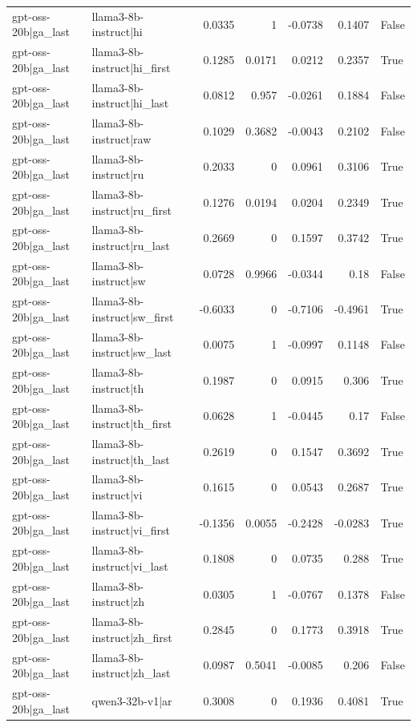 \begin{table}
\begin{tabular}{l l r r r r l}
gpt-oss-20b|ga_last & llama3-8b-instruct|hi & 0.0335 & 1 & -0.0738 & 0.1407 & False \\
gpt-oss-20b|ga_last & llama3-8b-instruct|hi_first & 0.1285 & 0.0171 & 0.0212 & 0.2357 & True \\
gpt-oss-20b|ga_last & llama3-8b-instruct|hi_last & 0.0812 & 0.957 & -0.0261 & 0.1884 & False \\
gpt-oss-20b|ga_last & llama3-8b-instruct|raw & 0.1029 & 0.3682 & -0.0043 & 0.2102 & False \\
gpt-oss-20b|ga_last & llama3-8b-instruct|ru & 0.2033 & 0 & 0.0961 & 0.3106 & True \\
gpt-oss-20b|ga_last & llama3-8b-instruct|ru_first & 0.1276 & 0.0194 & 0.0204 & 0.2349 & True \\
gpt-oss-20b|ga_last & llama3-8b-instruct|ru_last & 0.2669 & 0 & 0.1597 & 0.3742 & True \\
gpt-oss-20b|ga_last & llama3-8b-instruct|sw & 0.0728 & 0.9966 & -0.0344 & 0.18 & False \\
gpt-oss-20b|ga_last & llama3-8b-instruct|sw_first & -0.6033 & 0 & -0.7106 & -0.4961 & True \\
gpt-oss-20b|ga_last & llama3-8b-instruct|sw_last & 0.0075 & 1 & -0.0997 & 0.1148 & False \\
gpt-oss-20b|ga_last & llama3-8b-instruct|th & 0.1987 & 0 & 0.0915 & 0.306 & True \\
gpt-oss-20b|ga_last & llama3-8b-instruct|th_first & 0.0628 & 1 & -0.0445 & 0.17 & False \\
gpt-oss-20b|ga_last & llama3-8b-instruct|th_last & 0.2619 & 0 & 0.1547 & 0.3692 & True \\
gpt-oss-20b|ga_last & llama3-8b-instruct|vi & 0.1615 & 0 & 0.0543 & 0.2687 & True \\
gpt-oss-20b|ga_last & llama3-8b-instruct|vi_first & -0.1356 & 0.0055 & -0.2428 & -0.0283 & True \\
gpt-oss-20b|ga_last & llama3-8b-instruct|vi_last & 0.1808 & 0 & 0.0735 & 0.288 & True \\
gpt-oss-20b|ga_last & llama3-8b-instruct|zh & 0.0305 & 1 & -0.0767 & 0.1378 & False \\
gpt-oss-20b|ga_last & llama3-8b-instruct|zh_first & 0.2845 & 0 & 0.1773 & 0.3918 & True \\
gpt-oss-20b|ga_last & llama3-8b-instruct|zh_last & 0.0987 & 0.5041 & -0.0085 & 0.206 & False \\
gpt-oss-20b|ga_last & qwen3-32b-v1|ar & 0.3008 & 0 & 0.1936 & 0.4081 & True \\

\end{tabular}
\end{table}
